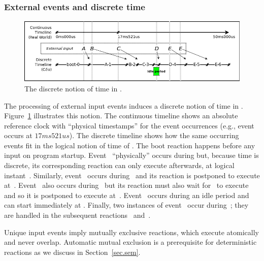 
\subsubsection*{External events and discrete time}

\begin{figure}[b]
\centering
\includegraphics[width=\columnwidth]{tick}
\caption{The discrete notion of time in \CEU.}
\label{fig.ticks}
\end{figure}

The processing of external input events induces a discrete notion of time in
\CEU.
%
Figure~\ref{fig.ticks} illustrates this notion.
%
The continuous timeline shows an absolute reference clock with ``physical
timestamps'' for the event occurrences (e.g., event~ occurs at
$17ms521us$).
%
The discrete timeline shows how the same occurring events fit in the logical
notion of time of \CEU.
%
The boot reaction  happens before any input on program startup.
%
Event~ ``physically'' occurs during  but, because time
is discrete, its corresponding reaction can only execute afterwards, at
logical instant~.
%
Similarly, event~ occurs during~ and its reaction is
postponed to execute at~.
%
Event~ also occurs during~ but its reaction must also wait
for~ to execute and so it is postponed to execute at~.
%
Event~ occurs during an idle period and can start immediately at
.
%
Finally, two instances of event~ occur during~; they are
handled in the subsequent reactions~ and~.

Unique input events imply mutually exclusive reactions, which execute
atomically and never overlap.
%
Automatic mutual exclusion is a prerequisite for deterministic reactions as
we discuss in Section~\ref{sec.sem}.
%

